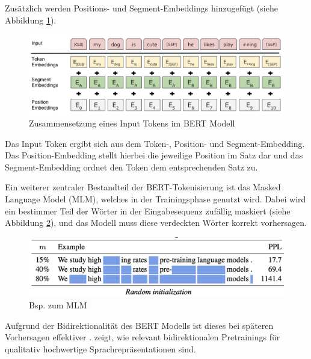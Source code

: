 Zusätzlich werden Positions- und Segment-Embeddings hinzugefügt (siehe Abbildung \ref{fig:bert_tokenizierung}).

\begin{figure}[htbp]
    \begin{center}
        \includegraphics[scale=0.4]{static/bert_tokenizierung.png}
        \caption{\label{fig:bert_tokenizierung} Zusammensetzung eines Input Tokens im BERT Modell \cite{devlin2019}}
    \end{center}
\end{figure}

Das Input Token ergibt sich aus dem Token-, Position- und Segment-Embedding. Das Position-Embedding stellt hierbei die jeweilige
Position im Satz dar und das Segment-Embedding ordnet den Token dem entsprechenden Satz zu.

Ein weiterer zentraler Bestandteil der BERT-Tokenisierung ist das Masked Language Model (MLM), welches in der Trainingsphase genutzt wird.
Dabei wird ein bestimmer Teil der Wörter in der Eingabesequenz zufällig maskiert (siehe Abbildung \ref{fig:mlm_bert}), 
und das Modell muss diese verdeckten Wörter korrekt vorhersagen.

\begin{figure}[htbp]
    \begin{center}
        \includegraphics[scale=0.5]{static/mlm_bert.png}
        \caption{\label{fig:mlm_bert} Bsp. zum MLM \cite{wettig2023}}
    \end{center}
\end{figure}

Aufgrund der Bidirektionalität des BERT Modells ist dieses bei späteren Vorhersagen effektiver \cite{wettig2023}. 
\cite{devlin2019} zeigt, wie relevant bidirektionalen Pretrainings für qualitativ hochwertige Sprachrepräsentationen sind.

